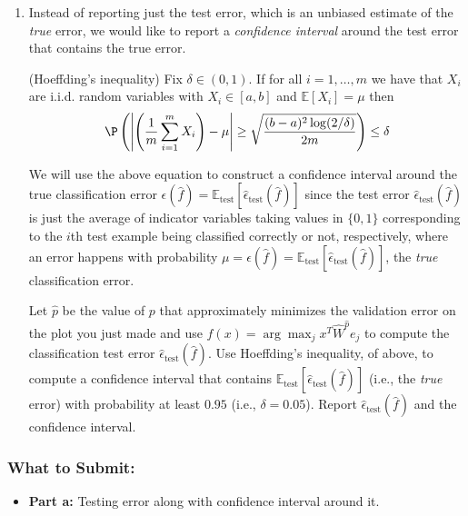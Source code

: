 \documentclass{article}
\begin{document}
\begin{bprob}
    \begin{enumerate}
        
        \item {} Instead of reporting just the test error, which is an unbiased estimate of the \emph{true} error, we would like to report a \emph{confidence interval} around the test error that contains the true error.
        \begin{lemma}(Hoeffding's inequality)
            Fix $\delta \in (0,1)$. If for all $i=1,\dots,m$ we have that $X_i$ are i.i.d. random variables with $X_i \in [a,b]$ and $\mathbb{E}[X_i] = \mu$ then
            \begin{align*}
                \P\left( \left| \left(\frac{1}{m} \sum_{i=1}^m X_i\right) - \mu \right| \geq \sqrt{\frac{(b-a)^2\log(2/\delta)}{2m}} \right) \leq \delta
            \end{align*}
        \end{lemma}
        We will use the above equation to construct a confidence interval around the true classification error $\epsilon(\widehat{f})=\mathbb{E}_{\text{test}}[\widehat{\epsilon}_{\textrm{test}}(\widehat{f})]$ since the test error $\widehat{\epsilon}_{\textrm{test}}(\widehat{f})$ is just the average of indicator variables taking values in $\{0,1\}$ corresponding to the $i$th test example being classified correctly or not, respectively, where an error happens with probability $\mu=\epsilon(\widehat{f})=\mathbb{E}_{\text{test}}[\widehat{\epsilon}_{\textrm{test}}(\widehat{f})]$, the \emph{true} classification error. 
        
        Let $\widehat{p}$ be the value of $p$ that approximately minimizes the validation error on the plot you just made and use $\widehat{f}(x) = \arg\max_j x^T \widehat{W}^{\widehat{p}} e_j$ to compute the classification test error $\widehat{\epsilon}_{\textrm{test}}(\widehat{f})$. Use Hoeffding's inequality, of above, to compute a confidence interval that contains $\mathbb{E}_{\text{test}}[\widehat{\epsilon}_{\textrm{test}}(\widehat{f})]$ (i.e., the \emph{true} error) with probability at least $0.95$ (i.e., $\delta=0.05$). Report $\widehat{\epsilon}_{\textrm{test}}(\widehat{f})$ and the confidence interval. 
    \end{enumerate}
    
    \subsubsection*{What to Submit:}
    \begin{itemize}
        \item \textbf{Part a:} Testing error along with confidence interval around it.
    \end{itemize}
\end{bprob}
\end{document}
